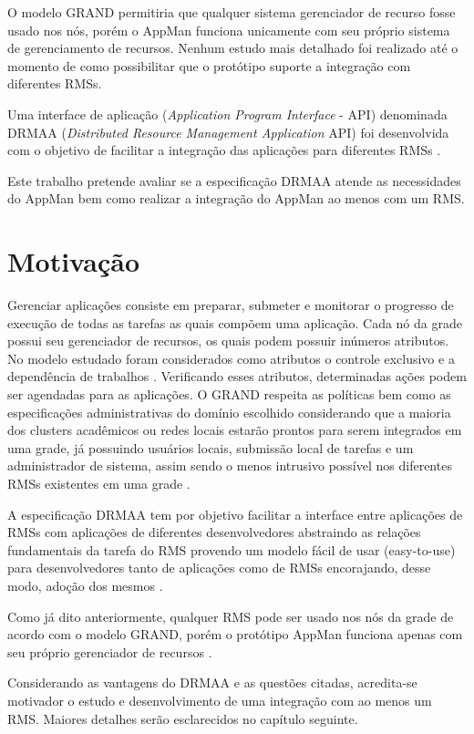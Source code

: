 O modelo GRAND permitiria que qualquer sistema gerenciador de recurso fosse usado nos nós, porém o AppMan funciona unicamente com seu próprio sistema de gerenciamento de recursos. Nenhum estudo mais detalhado foi realizado até o momento de como possibilitar que o protótipo suporte a integração com diferentes RMSs.

Uma interface de aplicação (\emph{Application Program Interface} - API) denominada DRMAA (\emph{Distributed Resource Management Application} API) foi desenvolvida com o objetivo de facilitar a integração das aplicações para diferentes RMSs \cite{Rajic2004}.

Este trabalho pretende avaliar se a especificação DRMAA atende as necessidades do AppMan bem como realizar a integração do AppMan ao menos com um RMS.

\section{Motivação}
Gerenciar aplicações consiste em preparar, submeter e monitorar o progresso de execução de todas as tarefas as quais compõem uma aplicação. Cada nó da grade possui seu gerenciador de recursos, os quais podem possuir inúmeros atributos. No modelo estudado foram considerados como atributos o controle exclusivo e a dependência de trabalhos \cite{Mangan2006}. Verificando esses atributos, determinadas ações podem ser agendadas para as aplicações. O GRAND respeita as políticas bem como as especificações administrativas do domínio escolhido considerando que a maioria dos clusters acadêmicos ou redes locais estarão prontos para serem integrados em uma grade, já possuindo usuários locais, submissão local de tarefas e um administrador de sistema, assim sendo o menos intrusivo possível nos diferentes RMSs existentes em uma grade \cite{Mangan2006}.

A especificação DRMAA tem por objetivo facilitar a interface entre aplicações de RMSs com aplicações de diferentes desenvolvedores abstraindo as relações fundamentais da tarefa do RMS provendo um modelo fácil de usar (easy-to-use) para desenvolvedores tanto de aplicações como de RMSs encorajando, desse modo, adoção dos mesmos \cite{Rajic2004}.

Como já dito anteriormente, qualquer RMS pode ser usado nos nós da grade de acordo com o modelo GRAND, porém o protótipo AppMan funciona apenas com seu próprio gerenciador de recursos \cite{Mangan2006}.

Considerando as vantagens do DRMAA \cite{Troeger2007} e as questões citadas, acredita-se motivador o estudo e desenvolvimento de uma integração com ao menos um RMS. Maiores detalhes serão esclarecidos no capítulo seguinte.

